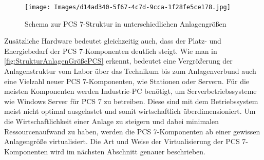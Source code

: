 \vspace{-4.0mm}
\begin{figure}[H]
    \centering
    \texttt{[image: Images/d14ad340-5f67-4c7d-9cca-1f28fe5ce178.jpg]}\caption[Schema zur PCS 7-Struktur in unterschiedlichen Anlagengrößen]{Schema zur PCS 7-Struktur in unterschiedlichen Anlagengrößen \cite[S.~8]{SiemensAG2020}}
    \label{fig:StrukturAnlagenGrößePCS}
\end{figure}
\vspace{-3.0mm}
Zusätzliche Hardware bedeutet gleichzeitig auch, dass der Platz- und Energiebedarf der PCS 7-Komponenten deutlich steigt. Wie man in \autoref{fig:StrukturAnlagenGrößePCS} erkennt, bedeutet eine Vergrößerung der Anlagenstruktur vom Labor über das Technikum bis zum Anlagenverbund auch eine Vielzahl neuer PCS 7-Komponenten, wie Stationen oder Servern. Für die meisten Komponenten werden Industrie-PC benötigt, um Serverbetriebssysteme wie Windows Server für PCS 7 zu betreiben. Diese sind mit dem Betriebssystem meist nicht optimal ausgelastet und somit wirtschaftlich überdimensioniert. Um die Wirtschaftlichkeit einer Anlage zu steigern und dabei minimalen Ressourcenaufwand zu haben, werden die PCS 7-Komponenten ab einer gewissen Anlagengröße virtualisiert. Die Art und Weise der Virtualisierung der PCS 7-Komponenten wird im nächsten Abschnitt genauer beschrieben.

